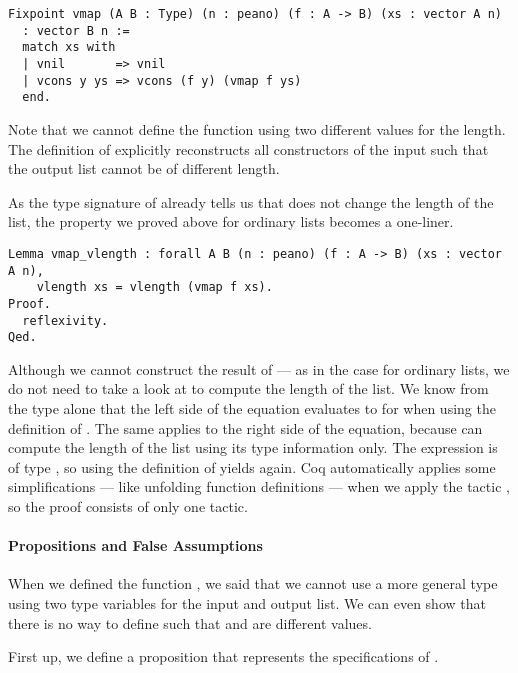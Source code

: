 \begin{verbatim}
Fixpoint vmap (A B : Type) (n : peano) (f : A -> B) (xs : vector A n)
  : vector B n :=
  match xs with
  | vnil       => vnil
  | vcons y ys => vcons (f y) (vmap f ys)
  end.
\end{verbatim}

Note that we cannot define the function using two different values for the length.
The definition of  explicitly reconstructs all constructors of the input  such that the output list cannot be of different length.

As the type signature of  already tells us that  does not change the length of the list, the property we proved above for ordinary lists becomes a one-liner.

\begin{verbatim}
Lemma vmap_vlength : forall A B (n : peano) (f : A -> B) (xs : vector A n),
    vlength xs = vlength (vmap f xs).
Proof.
  reflexivity.
Qed.
\end{verbatim}

Although we cannot construct the result of  --- as in the case for ordinary lists, we do not need to take a look at  to compute the length of the list.
We know from the type alone that the left side of the equation evaluates to  for  when using the definition of .
The same applies to the right side of the equation, because  can compute the length of the list using its type information only.
The expression  is of type , so using the definition of  yields  again.
Coq automatically applies some simplifications --- like unfolding function definitions --- when we apply the tactic , so the proof consists of only one tactic.

\paragraph{Propositions and False Assumptions}

When we defined the function , we said that we cannot use a more general type using two type variables  for the input and output list.
We can even show that there is no way to define  such that  and  are different values.

First up, we define a proposition  that represents the specifications of .

